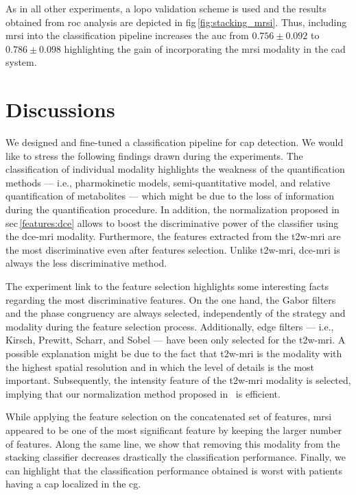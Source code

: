 \documentclass[final,3p,times,twocolumn]{elsarticle}
\begin{document}
As in all other experiments, a \ac{lopo} validation scheme is used and the
results obtained from \ac{roc} analysis are depicted in
\acs{fig}\,\ref{fig:stacking_mrsi}. Thus, including \ac{mrsi} into the
classification pipeline increases the \ac{auc} from $0.756 \pm 0.092$ to $0.786
\pm 0.098$ highlighting the gain of incorporating the \ac{mrsi} modality in the
\ac{cad} system.

\section{Discussions}\label{sec:conclusion}

We designed and fine-tuned a classification pipeline for \ac{cap} detection.
We would like to stress the following findings drawn during the
experiments. The classification of individual modality highlights the weakness
of the quantification methods --- i.e., pharmokinetic models, semi-quantitative
model, and relative quantification of metabolites --- which might be due to the
loss of information during the quantification procedure. In addition, the
normalization proposed in \acs{sec}\,\ref{features:dce} allows to boost the
discriminative power of the classifier using the \ac{dce}-\ac{mri}
modality. Furthermore, the features extracted from the \ac{t2w}-\ac{mri} are
the most discriminative even after features selection. Unlike
\ac{t2w}-\ac{mri}, \ac{dce}-\ac{mri} is always the less discriminative method.

The experiment link to the feature selection highlights some interesting facts
regarding the most discriminative features. On the one hand, the Gabor filters and
the phase congruency are always selected, independently of the strategy and
modality during the feature selection process. Additionally, edge filters ---
i.e., Kirsch, Prewitt, Scharr, and Sobel --- have been only selected for the
\ac{t2w}-\ac{mri}. A possible explanation might be due to the fact that
\ac{t2w}-\ac{mri} is the modality with the highest spatial resolution and in
which the level of details is the most important. Subsequently, the intensity
feature of the \ac{t2w}-\ac{mri} modality is selected, implying that our
normalization method proposed in~\cite{lemaitre2016normalization} is
efficient.

While applying the feature selection on the concatenated set of features,
\ac{mrsi} appeared to be one of the most significant feature by keeping the
larger number of features. Along the same line, we show that removing this
modality from the stacking classifier decreases drastically the classification
performance. Finally, we can highlight that the classification performance
obtained is worst with patients having a \ac{cap} localized in the
\ac{cg}.
\end{document}
